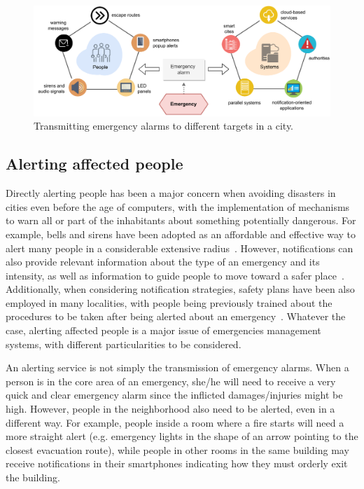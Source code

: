 \begin{refsection}
\begin{figure}[htbp]
  \centering
  \includegraphics[scale=0.75]{Chapters/2-Survey/images/notifications.pdf}
  \caption{Transmitting emergency alarms to different targets in a city.}\label{Fig:notifications}
\end{figure}

\subsection{Alerting affected people}

Directly alerting people has been a major concern when avoiding disasters in cities even before the age of computers, with the implementation of mechanisms to warn all or part of the inhabitants about something potentially dangerous. For example, bells and sirens have been adopted as an affordable and effective way to alert many people in a considerable extensive radius~\cite{socialmedia5,citiesemergencies1}. However, notifications can also provide relevant information about the type of an emergency and its intensity, as well as information to guide people to move toward a safer place~\cite{emergenciesmetric2}. Additionally, when considering notification strategies, safety plans have been also employed in many localities, with people being previously trained about the procedures to be taken after being alerted about an emergency~\cite{quakeculture,citiesdisasters2}. Whatever the case, alerting affected people is a major issue of emergencies management systems, with different particularities to be considered. 

An alerting service is not simply the transmission of emergency alarms. When a person is in the core area of an emergency, she/he will need to receive a very quick and clear emergency alarm since the inflicted damages/injuries might be high. However, people in the neighborhood also need to be alerted, even in a different way. For example, people inside a room where a fire starts will need a more straight alert (e.g. emergency lights in the shape of an arrow pointing to the closest evacuation route), while people in other rooms in the same building may receive notifications in their smartphones indicating how they must orderly exit the building. 


\end{refsection}

